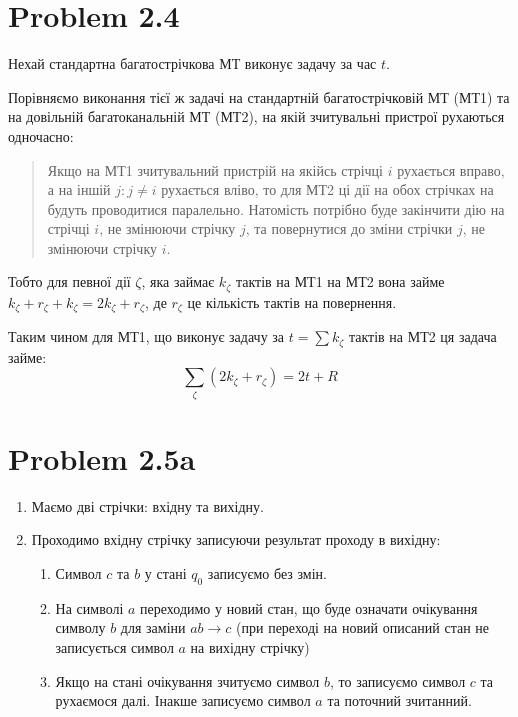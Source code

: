 \documentclass[12pt,letterpaper]{article}
\begin{document}
\tableofcontents
\newpage
\section{Problem 2.4}

Нехай стандартна багатострічкова МТ виконує задачу за час $t$.

Порівняємо виконання тієї ж задачі на стандартній багатострічковій МТ (МТ1) та на
довільній багатоканальній МТ (МТ2), на якій зчитувальні пристрої рухаються одночасно:
\begin{quotation}
    Якщо на МТ1 зчитувальний пристрій на якійсь стрічці $i$ рухається вправо,
    а на іншій $j : j \neq i$ рухається вліво, то для МТ2 ці дії на обох стрічках
    на будуть проводитися паралельно. Натомість потрібно буде закінчити дію на
    стрічці $i$, не змінюючи стрічку $j$, та повернутися до зміни стрічки $j$,
    не змінюючи стрічку $i$.
\end{quotation}

Тобто для певної дії $\zeta$, яка займає $k_{\zeta}$ тактів на МТ1 на МТ2 вона займе
$k_{\zeta} + r_{\zeta} + k_{\zeta} = 2k_{\zeta} + r_{\zeta}$, де $r_{\zeta}$
це кількість тактів на повернення.

Таким чином для МТ1, що виконує задачу за $t = \sum k_{\zeta}$ тактів на МТ2
ця задача займе:
\[ \sum_{\zeta} (2k_{\zeta} + r_{\zeta}) = 2t + R \]

\section{Problem 2.5a}

\begin{enumerate}
    \item Маємо дві стрічки: вхідну та вихідну.

    \item Проходимо вхідну стрічку записуючи результат проходу в вихідну:
        \begin{enumerate}
            \item Символ $c$ та $b$ у стані $q_0$ записуємо без змін.
            \item На символі $a$ переходимо у новий стан, що буде означати очікування
                символу $b$ для заміни $ab \rightarrow c$ (при переході на новий
                описаний стан не записується символ $a$ на вихідну стрічку)
            \item Якщо на стані очікування зчитуємо символ $b$, то записуємо символ $c$
                та рухаємося далі. Інакше записуємо символ $a$ та поточний зчитанний.
        \end{enumerate}
\end{enumerate}
\end{document}

